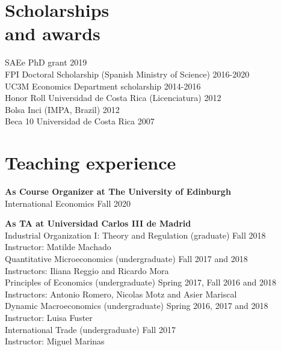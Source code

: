 \documentclass[margin]{res} %
\begin{document}
\begin{resume}

\section{Scholarships \\ and awards} 

SAEe PhD grant \hfill 2019\\
FPI Doctoral Scholarship (Spanish Ministry of Science) \hfill 2016-2020 \\
UC3M Economics Department scholarship \hfill 2014-2016 \\
Honor Roll Universidad de Costa Rica (Licenciatura) \hfill 2012 \\ 
Bolsa Inci (IMPA, Brazil) \hfill 2012 \\
Beca 10 Universidad de Costa Rica \hfill 2007


\section{Teaching experience}

{\bf As Course Organizer at The University of Edinburgh} \\
International Economics \hfill Fall 2020

{\bf As TA at Universidad Carlos III de Madrid} \\
Industrial Organization I: Theory and Regulation (graduate) \hfill Fall 2018 \\
Instructor: Matilde Machado \\
Quantitative Microeconomics (undergraduate) \hfill Fall 2017 and 2018 \\
Instructors: Iliana Reggio and Ricardo Mora \\
Principles of Economics (undergraduate) \hfill Spring 2017, Fall 2016 and 2018 \\
Instructors: Antonio Romero, Nicolas Motz and Asier Mariscal \\
Dynamic Macroeconomics (undergraduate) \hfill Spring 2016, 2017 and 2018 \\
Instructor: Luisa Fuster \\
International Trade (undergraduate) \hfill Fall 2017 \\ 
Instructor: Miguel Marinas 


\end{resume}
\end{document}
